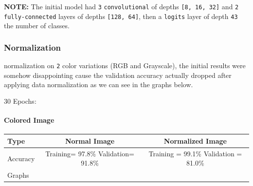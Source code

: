 \documentclass[11pt]{article}
\begin{document}
\textbf{NOTE:} The initial model had \texttt{3} \texttt{convolutional}
of depths \texttt{{[}8,\ 16,\ 32{]}} and \texttt{2}
\texttt{fully-connected} layers of depths \texttt{{[}128,\ 64{]}}, then
a \texttt{logits} layer of depth \texttt{43} the number of classes.

\hypertarget{normalization}{%
\subsubsection{Normalization}\label{normalization}}

normalization on \texttt{2} color variations (RGB and Grayscale), the
initial results were somehow disappointing cause the validation accuracy
actually dropped after applying data normalization as we can see in the
graphs below.

30 Epochs:

\hypertarget{colored-image}{%
\paragraph{Colored Image}\label{colored-image}}

\begin{longtable}[]{@{}lcc@{}}
\toprule
\begin{minipage}[b]{0.24\columnwidth}\raggedright
Type\strut
\end{minipage} & \begin{minipage}[b]{0.34\columnwidth}\centering
Normal Image\strut
\end{minipage} & \begin{minipage}[b]{0.34\columnwidth}\centering
Normalized Image\strut
\end{minipage}\tabularnewline
\midrule
\endhead
\begin{minipage}[t]{0.24\columnwidth}\raggedright
Accuracy\strut
\end{minipage} & \begin{minipage}[t]{0.34\columnwidth}\centering
Training= 97.8\% Validation= 91.8\%\strut
\end{minipage} & \begin{minipage}[t]{0.34\columnwidth}\centering
Training = 99.1\% Validation = 81.0\%\strut
\end{minipage}\tabularnewline
\begin{minipage}[t]{0.24\columnwidth}\raggedright
Graphs\strut
\end{minipage} & \begin{minipage}[t]{0.34\columnwidth}\centering
\strut
\end{minipage} & \begin{minipage}[t]{0.34\columnwidth}\centering
\strut
\end{minipage}\tabularnewline
\bottomrule
\end{longtable}
\end{document}
